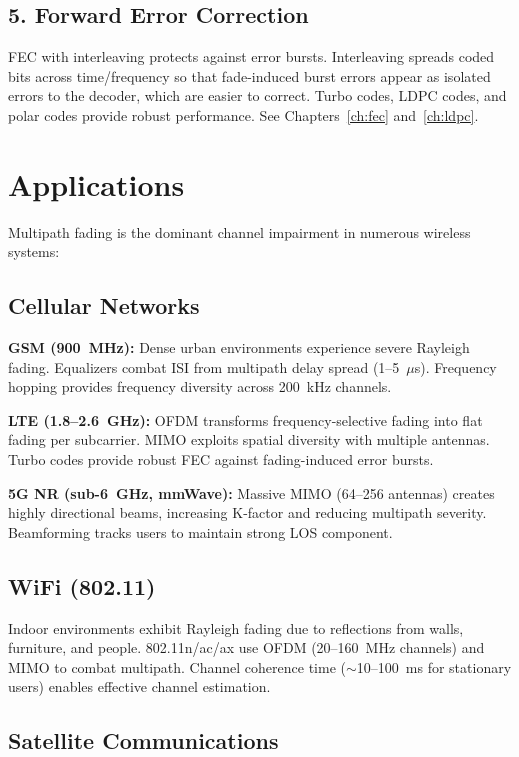 \subsection{5. Forward Error Correction}

FEC with interleaving protects against error bursts. Interleaving spreads coded bits across time/frequency so that fade-induced burst errors appear as isolated errors to the decoder, which are easier to correct. Turbo codes, LDPC codes, and polar codes provide robust performance. See Chapters~\ref{ch:fec} and~\ref{ch:ldpc}.

\section{Applications}

Multipath fading is the dominant channel impairment in numerous wireless systems:

\subsection{Cellular Networks}

\textbf{GSM (900~MHz):} Dense urban environments experience severe Rayleigh fading. Equalizers combat ISI from multipath delay spread (1--5~$\mu$s). Frequency hopping provides frequency diversity across 200~kHz channels.

\textbf{LTE (1.8--2.6~GHz):} OFDM transforms frequency-selective fading into flat fading per subcarrier. MIMO exploits spatial diversity with multiple antennas. Turbo codes provide robust FEC against fading-induced error bursts.

\textbf{5G NR (sub-6~GHz, mmWave):} Massive MIMO (64--256 antennas) creates highly directional beams, increasing K-factor and reducing multipath severity. Beamforming tracks users to maintain strong LOS component.

\subsection{WiFi (802.11)}

Indoor environments exhibit Rayleigh fading due to reflections from walls, furniture, and people. 802.11n/ac/ax use OFDM (20--160~MHz channels) and MIMO to combat multipath. Channel coherence time ($\sim$10--100~ms for stationary users) enables effective channel estimation.

\subsection{Satellite Communications}

